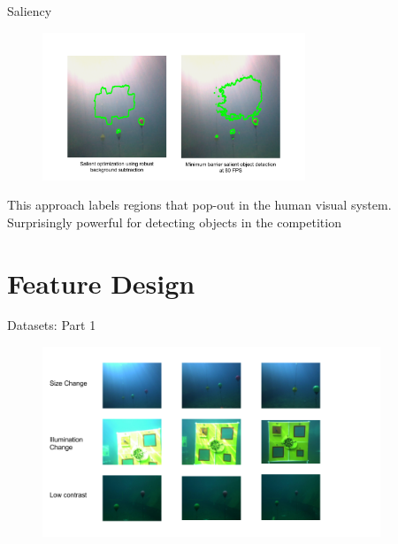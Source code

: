 \documentclass[14pt]{beamer}
\begin{document}
\begin{frame}{Saliency}

  \begin{figure}[ht]
      \centering
      \includegraphics[width=0.7\textwidth, height=0.4\textwidth]{figs/saliency.png}
  \end{figure}

  {\small This approach labels regions that pop-out in the human visual system.
    Surprisingly powerful for detecting objects in the competition}
\end{frame}

\section{Feature Design}

\begin{frame}{Datasets: Part 1}
  \begin{figure}[ht]
      \centering
      \includegraphics[width=0.9\textwidth, height=0.6\textwidth]{figs/data1.png}
  \end{figure}
\end{frame}
\end{document}
